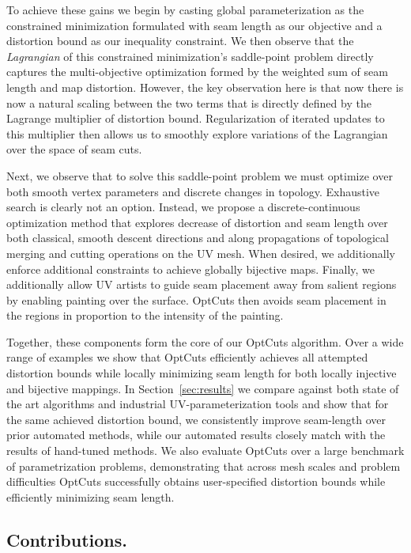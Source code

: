   To achieve these gains we begin by casting global parameterization as the constrained minimization formulated with seam length as our objective and a distortion bound as our inequality constraint. We then observe that the \emph{Lagrangian} of this constrained minimization's saddle-point problem directly captures the multi-objective optimization formed by the weighted sum of seam length and map distortion. However, the key observation here is that now there is now a natural scaling between the two terms that is directly defined by the Lagrange multiplier of distortion bound. Regularization of iterated updates to this multiplier then allows us to smoothly explore variations of the Lagrangian over the space of seam cuts. 
  
  Next, we observe that to solve this saddle-point problem we must optimize over both smooth vertex parameters and discrete changes in topology. Exhaustive search is clearly not an option. Instead, we propose a discrete-continuous optimization method that explores decrease of distortion and seam length over both classical, smooth descent directions and along propagations of topological merging and cutting operations on the UV mesh. When desired, we additionally enforce additional constraints to achieve globally bijective maps. Finally, we additionally allow UV artists to guide seam placement away from salient regions by enabling painting over the surface. OptCuts then avoids seam placement in the regions in proportion to the intensity of the painting.
  
  Together, these components form the core of our OptCuts algorithm. Over a wide range of examples we show that OptCuts efficiently achieves all attempted distortion bounds while locally minimizing seam length for both locally injective and bijective mappings. In Section~\ref{sec:results} we compare against both state of the art algorithms and industrial UV-parameterization tools and show that for the same achieved distortion bound, we consistently improve seam-length over prior automated methods, while our automated results closely match with the results of hand-tuned methods. We also evaluate OptCuts over a large benchmark of parametrization problems, demonstrating that across mesh scales and problem difficulties OptCuts successfully obtains user-specified distortion bounds while efficiently minimizing seam length. 
  
\subsection{Contributions.}

